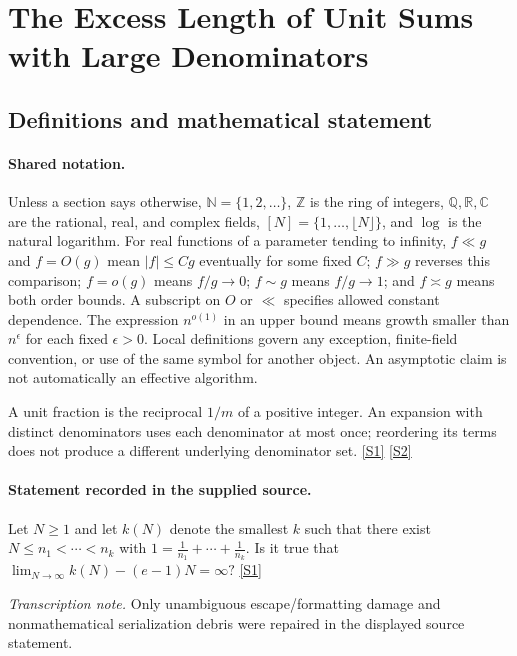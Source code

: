 \documentclass[11pt,a4paper]{article}
\newcommand{\N}{\mathbb{N}}
\newcommand{\Z}{\mathbb{Z}}
\newcommand{\Q}{\mathbb{Q}}
\newcommand{\R}{\mathbb{R}}
\newcommand{\C}{\mathbb{C}}
\newcommand{\sref}[2]{\hyperlink{source:#1:#2}{[S#2]}}
\begin{document}
\section{The Excess Length of Unit Sums with Large Denominators}\label{statement}


\subsection{Definitions and mathematical statement}

\paragraph{Shared notation.}Unless a section says otherwise, $\N=\{1,2,\ldots\}$,
$\Z$ is the ring of integers, $\Q,\R,\C$ are the rational, real, and complex
fields, $[N]=\{1,\ldots,\lfloor N\rfloor\}$, and $\log$ is the natural
logarithm. For real functions of a parameter tending to infinity,
$f\ll g$ and $f=O(g)$ mean $|f|\leq Cg$ eventually for some fixed $C$;
$f\gg g$ reverses this comparison; $f=o(g)$ means $f/g\to0$;
$f\sim g$ means $f/g\to1$; and $f\asymp g$ means both order bounds.
A subscript on $O$ or $\ll$ specifies allowed constant dependence.
The expression $n^{o(1)}$ in an upper bound means growth smaller than
$n^\epsilon$ for each fixed $\epsilon>0$. Local definitions govern any
exception, finite-field convention, or use of the same symbol for another
object. An asymptotic claim is not automatically an effective algorithm.



A unit fraction is the reciprocal $1/m$ of a positive integer. An expansion with distinct denominators uses each denominator at most once; reordering its terms does not produce a different underlying denominator set. \sref{statement}{1} \sref{statement}{2}

\paragraph{Statement recorded in the supplied source.}
Let $N\geq 1$ and let $k(N)$ denote the smallest $k$ such that there exist $N\leq n_1<\cdots <n_k$ with $ 1=\frac{1}{n_1}+\cdots+\frac{1}{n_k}. $ Is it true that $ \lim_{N\to \infty} k(N)-(e-1)N=\infty? $ \sref{statement}{1}

{\small\emph{Transcription note.} Only unambiguous escape/formatting damage and nonmathematical serialization debris were repaired in the displayed source statement.}
\end{document}
